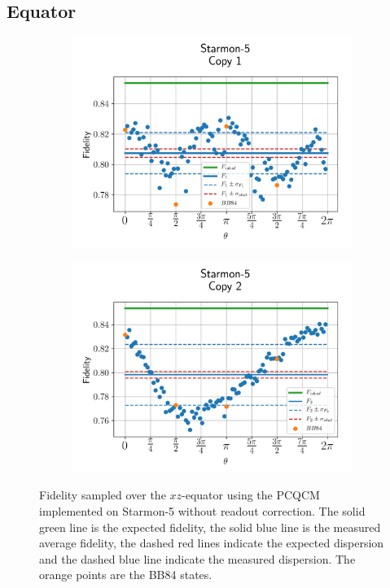\subsection{Equator}


\begin{figure}[H]
    \centering
    \begin{subfigure}{.5\textwidth}
      \centering
      \includegraphics[width=\textwidth]{Figures/PhaseCovariant/Starmon/OnlyEquator/results_starmon_copy1.png}
      \label{fig:pc_uncorrected_starmon_equator_1}
    \end{subfigure}%
    \begin{subfigure}{.5\textwidth}
      \centering
      \includegraphics[width=\textwidth]{Figures/PhaseCovariant/Starmon/OnlyEquator/results_starmon_copy2.png}
      \label{fig:pc_uncorrected_starmon_equator_2}
    \end{subfigure}
    \vspace{-0.5cm}
    \caption{Fidelity sampled over the $xz$-equator using the PCQCM implemented on Starmon-5 without readout correction.
    The solid green line is the expected fidelity, the solid blue line is the measured average fidelity, the dashed red lines indicate the expected dispersion and the dashed blue line indicate the measured dispersion. The orange points are the BB84 states.}
    \label{fig:pc_uncorrected_starmon_equator}
  \end{figure}
  
